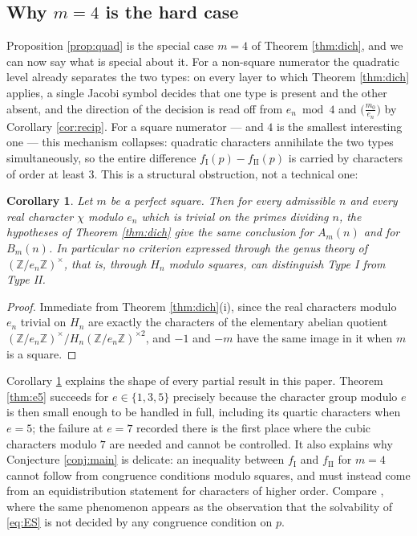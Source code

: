 \documentclass[11pt,reqno]{amsart}
\theoremstyle{plain}
\newtheorem{corollary}[theorem]{Corollary}
\theoremstyle{definition}
\numberwithin{equation}{section}
\newcommand{\Z}{\mathbb{Z}}
\newcommand{\fI}{f_{\mathrm{I}}}
\newcommand{\fII}{f_{\mathrm{II}}}
\begin{document}
\subsection{Why $m=4$ is the hard case}\label{sec:whyfour}
Proposition \ref{prop:quad} is the special case $m=4$ of Theorem \ref{thm:dich}, and
we can now say what is special about it. For a non-square numerator the quadratic
level already separates the two types: on every layer to which Theorem \ref{thm:dich}
applies, a single Jacobi symbol decides that one type is present and the other absent,
and the direction of the decision is read off from $e_{n}\bmod 4$ and
$\bigl(\tfrac{m_{0}}{e_{n}}\bigr)$ by Corollary \ref{cor:recip}. For a square numerator --- and $4$ is the smallest
interesting one --- this mechanism collapses: quadratic characters annihilate the two
types simultaneously, so the entire difference $\fI(p)-\fII(p)$ is carried by
characters of order at least $3$. This is a structural obstruction, not a technical
one:

\begin{corollary}\label{cor:blind}
Let $m$ be a perfect square. Then for every admissible $n$ and every real character
$\chi$ modulo $e_{n}$ which is trivial on the primes dividing $n$, the hypotheses of
Theorem \ref{thm:dich} give the \emph{same} conclusion for $A_{m}(n)$ and for
$B_{m}(n)$. In particular no criterion expressed through the genus theory of
$(\Z/e_{n}\Z)^{\times}$, that is, through $H_{n}$ modulo squares, can distinguish
Type I from Type II.
\end{corollary}

\begin{proof}
Immediate from Theorem \ref{thm:dich}(i), since the real characters modulo $e_{n}$
trivial on $H_{n}$ are exactly the characters of the elementary abelian quotient
$(\Z/e_{n}\Z)^{\times}/H_{n}(\Z/e_{n}\Z)^{\times2}$, and $-1$ and $-m$ have the same
image in it when $m$ is a square.
\end{proof}

Corollary \ref{cor:blind} explains the shape of every partial result in this paper.
Theorem \ref{thm:e5} succeeds for $e\in\{1,3,5\}$ precisely because the character group
modulo $e$ is then small enough to be handled in full, including its quartic characters
when $e=5$; the failure at $e=7$ recorded there is the first place where the cubic
characters modulo $7$ are needed and cannot be controlled. It also explains why
Conjecture \ref{conj:main} is delicate: an inequality between $\fI$ and $\fII$ for
$m=4$ cannot follow from congruence conditions modulo squares, and must instead come
from an equidistribution statement for characters of higher order. Compare
\cite[Prop.~1.6]{ElsholtzTao}, where the same phenomenon appears as the observation
that the solvability of \eqref{eq:ES} is not decided by any congruence condition on $p$.
\end{document}
